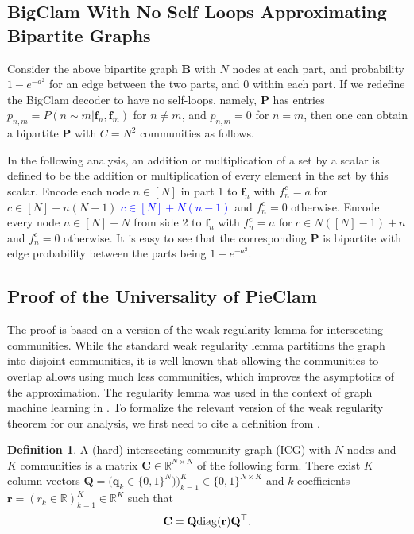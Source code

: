 \documentclass{article}
\theoremstyle{plain}
\theoremstyle{definition}
\newtheorem{definition}[theorem]{Definition}
\theoremstyle{remark}
\newcommand{\dan}[1]{{{\textcolor{blue}{ {#1}\textbf{}}}}}
\begin{document}
\subsection{BigClam With No Self Loops Approximating Bipartite Graphs}
\label{BigClam With No Self Loops Approximating Bipartites}

Consider the above bipartite graph  $\mathbf{B}$ with $N$ nodes at each part, and probability $1-e^{-a^2}$ for an edge between the two parts, and $0$ within each part. 
If we redefine the BigClam decoder to have no self-loops, namely, $\mathbf{P}$ has entries 
$p_{n,m}=P(n\sim m|\mathbf{f}_n, \mathbf{f}_m)$ for $n\neq m$, and $p_{n,m}=0$ for $n=m$, then one can obtain a bipartite $\mathbf{P}$ with $C=N^2$ communities as follows. 

In the following analysis, an addition or multiplication of a set by a scalar is defined to be the addition or multiplication of every element in the set by this scalar.
Encode each node $n\in[N]$ in part 1 to $\mathbf{f}_n$ with
$f_n^c=a$ for {\color{orange}$c\in [N]+n(N-1)$} \dan{$c\in [N] + N(n-1)$} and $f_n^c=0$ otherwise. Encode every node $n\in [N]+N$ from side 2 to $\mathbf{f}_n$ with
$f_n^c=a$ for $c\in N([N]-1)+n$ and $f_n^c=0$ otherwise. It is easy to see that the corresponding $\mathbf{P}$ is bipartite with edge probability between the parts being $1-e^{-a^2}$.






\subsection{Proof of the Universality of PieClam}
\label{Proof of the Universality of PieClam}

The proof is based on a version of the weak regularity lemma for intersecting communities. While the standard weak regularity lemma \cite{weakReg,Szemeredi_analyst} partitions the graph into disjoint communities, it is well known that allowing the communities to overlap allows using much less communities, which improves the asymptotics of the approximation. The regularity lemma was used in the context of graph machine learning in \cite{Levie_reg_23,Levie_intersecting_reg_24}. To formalize the relevant version of the weak regularity theorem for our analysis, we first need to cite a definition from \cite{Levie_intersecting_reg_24}.

\begin{definition}
    A (hard) intersecting community graph (ICG) with $N$ nodes and  $K$ communities is a matrix $\mathbf{C}\in\mathbb{R}^{N\times N}$ of the following form. There exist $K$ column vectors $\mathbf{Q}=\big(\mathbf{q}_k\in\{0,1\}^N\big))_{k=1}^K\in \{0,1\}^{N\times K}$ and $k$ coefficients $\mathbf{r}=(r_k\in\mathbb{R})_{k=1}^K\in\mathbb{R}^K$ such that
    \[\mathbf{C}= \mathbf{Q}{\rm diag}(\mathbf{r})\mathbf{Q}^{\top }.\]
\end{definition}
\end{document}
